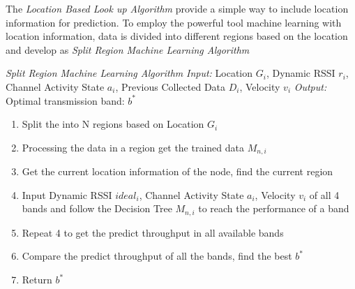 The \emph{Location Based Look up Algorithm} provide a simple way to include location information for prediction. To employ the powerful tool machine learning with location information, data is divided into different regions based on the location and develop as \emph{Split Region Machine Learning Algorithm}

\emph{Split Region Machine Learning Algorithm}
\emph{Input:} Location $G_i$, Dynamic RSSI $r_i$, Channel Activity State $a_i$, Previous Collected Data $D_i$, Velocity $v_i$ 
\emph{Output:} Optimal transmission band: $b^*$

\begin{enumerate}
\item Split the  into N regions based on Location $G_i$ 
\item Processing the data in a region get the trained data $M_{n,i}$ 
\item Get the current location information of the node, find the current region 
\item Input Dynamic RSSI $ideal_i$, Channel Activity State $a_i$, Velocity $v_i$ of all 4 bands and follow the Decision Tree $M_{n,i}$ to reach the performance of a band
\item Repeat 4 to get the predict throughput in all available bands
\item Compare the predict throughput of all the bands, find the best $b^*$
\item Return $b^*$
\end{enumerate}


 




